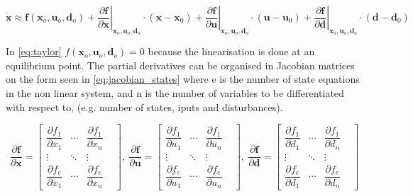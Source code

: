 \begin{equation} \label{eq:taylor}
	\dot{\textbf{x}}   \approx   \textbf{f}(\textbf{x}_o, \textbf{u}_o, \textbf{d}_o)   +   
	\left. \dfrac{\partial \textbf{f}}{\partial \textbf{x}} \right |_{\textbf{x}_o, \textbf{u}_o, \textbf{d}_o} \cdot (\textbf{x}-\textbf{x}_0) + 
	\left. \dfrac{\partial \textbf{f}}{\partial \textbf{u}} \right |_{\textbf{x}_o, \textbf{u}_o, \textbf{d}_o} \cdot (\textbf{u}-\textbf{u}_0) + 
	\left. \dfrac{\partial \textbf{f}}{\partial \textbf{d}} \right |_{\textbf{x}_o, \textbf{u}_o, \textbf{d}_o} \cdot (\textbf{d}-\textbf{d}_0)
\end{equation}

In \cref{eq:taylor} $f(\textbf{x}_o, \textbf{u}_o, \textbf{d}_o) = 0$ because the linearisation is done at an equilibrium point. The partial derivatives can be organised in Jacobian matrices on the form seen in \cref{eq:jacobian_states} where e is the number of state equations in the non linear system, and n is the number of variables to be differentiated with respect to, (e.g. number of states, iputs and disturbances). 

\begin{equation} \label{eq:jacobian_states}
	\dfrac{\partial \textbf{f}}{\partial \textbf{x}} =
		\begin{bmatrix}
			\dfrac{\partial f_1}{\partial x_1} & \cdots & \dfrac{\partial f_1}{\partial x_n} & \\
			\vdots & \ddots & \vdots & \\
			\dfrac{\partial f_e}{\partial x_1} & \cdots & \dfrac{\partial f_e}{\partial x_n} &
		\end{bmatrix}, \
	\dfrac{\partial \textbf{f}}{\partial \textbf{u}} = 	
		\begin{bmatrix}
			\dfrac{\partial f_1}{\partial u_1} & \cdots & \dfrac{\partial f_1}{\partial u_n} & \\
			\vdots & \ddots & \vdots & \\
			\dfrac{\partial f_e}{\partial u_1} & \cdots & \dfrac{\partial f_e}{\partial u_n} &
		\end{bmatrix}, \ 
	\dfrac{\partial \textbf{f}}{\partial \textbf{d}} = 	
		\begin{bmatrix}
			\dfrac{\partial f_1}{\partial d_1} & \cdots & \dfrac{\partial f_1}{\partial d_n} & \\
			\vdots & \ddots & \vdots & \\
			\dfrac{\partial f_e}{\partial d_1} & \cdots & \dfrac{\partial f_e}{\partial d_n} &
		\end{bmatrix}
\end{equation}


